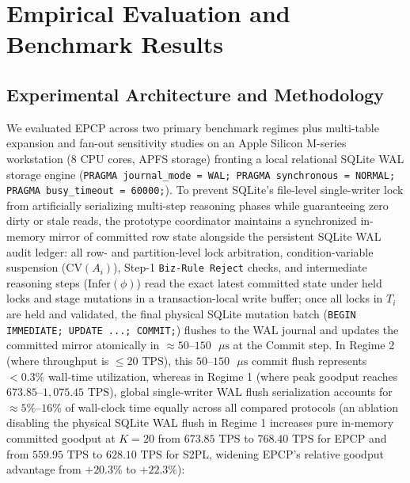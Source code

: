 \documentclass[conference,10pt]{IEEEtran}
\begin{document}
\section{Empirical Evaluation and Benchmark Results}

\subsection{Experimental Architecture and Methodology}
We evaluated EPCP across two primary benchmark regimes plus multi-table expansion and fan-out sensitivity studies on an Apple Silicon M-series workstation (8 CPU cores, APFS storage) fronting a local relational SQLite WAL storage engine (\texttt{PRAGMA journal\_mode = WAL; PRAGMA synchronous = NORMAL; PRAGMA busy\_timeout = 60000;}). To prevent SQLite's file-level single-writer lock from artificially serializing multi-step reasoning phases while guaranteeing zero dirty or stale reads, the prototype coordinator maintains a synchronized in-memory mirror of committed row state alongside the persistent SQLite WAL audit ledger: all row- and partition-level lock arbitration, condition-variable suspension ($\text{CV}(A_i)$), Step-1 \texttt{Biz-Rule Reject} checks, and intermediate reasoning steps ($\text{Infer}(\phi)$) read the exact latest committed state under held locks and stage mutations in a transaction-local write buffer; once all locks in $T_i$ are held and validated, the final physical SQLite mutation batch (\texttt{BEGIN IMMEDIATE; UPDATE ...; COMMIT;}) flushes to the WAL journal and updates the committed mirror atomically in $\approx 50\text{--}150\text{ }\mu\text{s}$ at the $\text{Commit}$ step. In Regime 2 (where throughput is $\le 20\text{ TPS}$), this $50\text{--}150\text{ }\mu\text{s}$ commit flush represents $< 0.3\%$ wall-time utilization, whereas in Regime 1 (where peak goodput reaches $673.85\text{--}1{,}075.45\text{ TPS}$), global single-writer WAL flush serialization accounts for $\approx 5\%\text{--}16\%$ of wall-clock time equally across all compared protocols (an ablation disabling the physical SQLite WAL flush in Regime 1 increases pure in-memory committed goodput at $K=20$ from $673.85\text{ TPS}$ to $768.40\text{ TPS}$ for EPCP and from $559.95\text{ TPS}$ to $628.10\text{ TPS}$ for S2PL, widening EPCP's relative goodput advantage from $+20.3\%$ to $+22.3\%$):
\end{document}

